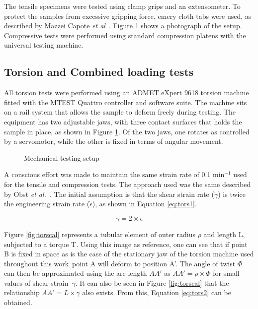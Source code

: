 \documentclass[main.tex]{subfiles}
\begin{document}
The tensile specimens were tested using clamp grips and an extensometer. To protect the samples from excessive gripping force, emery cloth tabs were used, as described by Mazzei Capote \emph{et al}~\cite{Capote2017}. Figure \ref{fig:testsetup} shows a photograph of the setup. Compressive tests were performed using standard compression platens with the universal testing machine. 
    
\subsection{Torsion and Combined loading tests}

All torsion tests were performed using an ADMET eXpert 9618 torsion machine fitted with the MTEST Quattro controller and software suite. The machine sits on a rail system that allows the sample to deform freely during testing. The equipment has two adjustable jaws, with three contact surfaces that holds the sample in place, as shown in Figure \ref{fig:testsetup}. Of the two jaws, one rotates as controlled by a servomotor, while the other is fixed in terms of angular movement. 

\begin{figure}[h]
	\center
	\hfill
	\caption{Mechanical testing setup} \label{fig:testsetup}
\end{figure} 

A conscious effort was made to maintain the same strain rate of 0.1 min$^{-1}$ used for the tensile and compression tests. The approach used was the same described by Obst \emph{et al.}~\cite{Obst2018}. The initial assumption is that the shear strain rate ($\dot{\gamma}$) is twice the engineering strain rate ($\dot{\epsilon}$), as shown in Equation \ref{eq:tors1}.

\begin{equation}\label{eq:tors1}
\dot{\gamma}= 2 \times \dot{\epsilon} 
\end{equation}

Figure \ref{fig:torscal} represents a tubular element of outer radius $\rho$ and length L, subjected to a torque T. Using this image as reference, one can see that if point B is fixed in space \textemdash as is the case of the stationary jaw of the torsion machine used throughout this work~\textemdash point A will deform to position A'. The angle of twist $\Phi$ can then be approximated using the arc length $AA'$ as $AA'=\rho \times \Phi$ for small values of shear strain~$\gamma$. It can also be seen in Figure \ref{fig:torscal} that the relationship $AA'=L\times \gamma$ also exists. From this, Equation \ref{eq:tors2} can be obtained.
\end{document}
